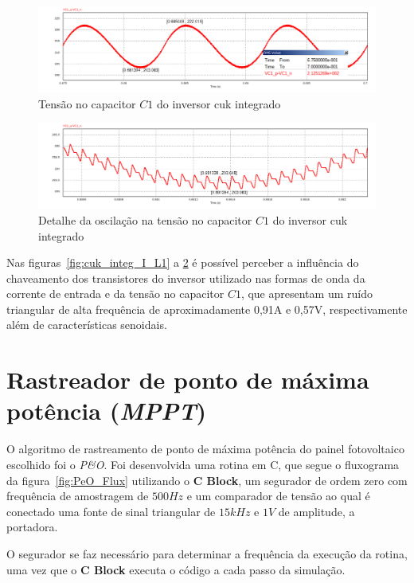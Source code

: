 \documentclass[
	12pt,				%
	openright,			%
	twoside,			%
	a4paper,			%
	english,			%
	french,				%
	spanish,			%
	brazil,				%
	]{abntex2}
\begin{document}
\begin{figure}[H]%
	\centering
		\includegraphics[width= \linewidth]{cuk_integ_VC1}
		\caption{Tensão no capacitor $C1$ do inversor cuk integrado}
		\label{fig:cuk_integ_V_C1}
\end{figure}

\begin{figure}[H]%
	\centering
		\includegraphics[width= \linewidth]{cuk_integ_ripp_VC1}
		\caption{Detalhe da oscilação na tensão no capacitor $C1$ do inversor cuk integrado}
		\label{fig:cuk_integ_ripp_V_C1}
\end{figure}

Nas figuras~\ref{fig:cuk_integ_I_L1} a \ref{fig:cuk_integ_ripp_V_C1} é possível perceber a influência do chaveamento dos transistores do inversor utilizado nas formas de onda da corrente de entrada e da tensão no capacitor $C1$, que apresentam um ruído triangular de alta frequência de aproximadamente 0,91A e 0,57V, respectivamente além de características senoidais.


\section{Rastreador de ponto de máxima potência (\textit{MPPT})}\label{sec:met_mppt}

O algoritmo de rastreamento de ponto de máxima potência do painel fotovoltaico escolhido foi o \textit{P\&O}. Foi desenvolvida uma rotina em C, que segue o fluxograma da figura~\ref{fig:PeO_Flux} utilizando o \textbf{C Block}, um segurador de ordem zero com frequência de amostragem de $500Hz$ e um comparador de tensão ao qual é conectado uma fonte de sinal triangular de $15kHz$ e $1V$ de amplitude, a portadora.

O segurador se faz necessário para determinar a frequência da execução da rotina, uma vez que o \textbf{C Block} executa o código a cada passo da simulação.
\end{document}
